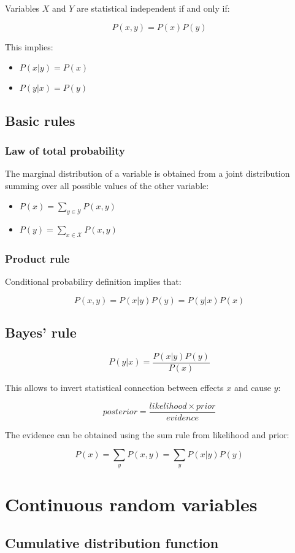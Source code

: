 Variables $X$ and $Y$ are statistical independent if and only if:

$$P(x,y) = P(x)P(y)$$

This implies:

\begin{multicols}{2}
	\begin{itemize}
		\item $P(x|y) = P(x)$
		\item $P(y|x) = P(y)$
	\end{itemize}
\end{multicols}

	\subsection{Basic rules}

		\subsubsection{Law of total probability}
		The marginal distribution of a variable is obtained from a joint distribution summing over all possible values of the other variable:

		\begin{multicols}{2}
			\begin{itemize}
				\item $P(x) = \sum\limits_{y\in\mathcal{Y}}P(x,y)$
				\item $P(y) = \sum\limits_{x\in\mathcal{X}}P(x,y)$
			\end{itemize}
		\end{multicols}

		\subsubsection{Product rule}
		Conditional probabiliry definition implies that:

		$$P(x,y) = P(x|y)P(y) = P(y|x)P(x)$$

	\subsection{Bayes' rule}

	$$P(y|x) = \frac{P(x|y)P(y)}{P(x)}$$

	This allows to invert statistical connection between effects $x$ and cause $y$:

	$$posterior = \frac{likelihood\times prior}{evidence}$$

	The evidence can be obtained using the sum rule from likelihood and prior:

	$$P(x) = \sum\limits_yP(x,y) = \sum\limits_yP(x|y)P(y)$$

\section{Continuous random variables}

	\subsection{Cumulative distribution function}
